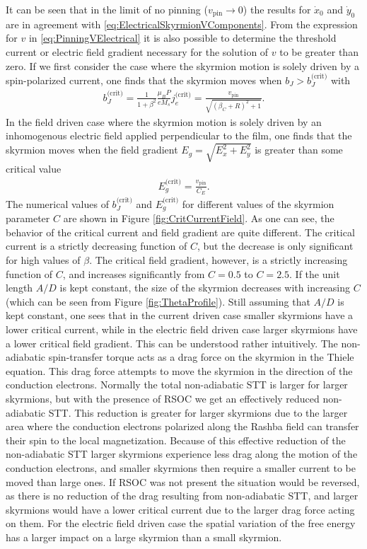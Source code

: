 It can be seen that in the limit of no pinning ($v_{\textrm{pin}} \rightarrow 0$) the results for $\dot{x}_0$ and $\dot{y}_0$ are in agreement with \eqref{eq:ElectricalSkyrmionVComponents}. From the expression for $v$ in \eqref{eq:PinningVElectrical} it is also possible to determine the threshold current or electric field gradient necessary for the solution of $v$ to be greater than zero. If we first consider the case where the skyrmion motion is solely driven by a spin-polarized current, one finds that the skyrmion moves when $b_J > b_J^{\textrm{(crit)}}$ with
\begin{align}
b_J^{\textrm{(crit)}} = \frac{1}{1+\beta^2} \frac{\mu_BP}{eM_s}j_e^{\textrm{(crit)}}= \frac{v_{\textrm{pin}}}{\sqrt{(\beta_C+R)^2+1}}.
\end{align}
In the field driven case where the skyrmion motion is solely driven by an inhomogenous electric field applied perpendicular to the film, one finds that the skyrmion moves when the field gradient $E_g = \sqrt{E_x^2+E_y^2}$ is greater than some critical value
\begin{align}
E_g^{\textrm{(crit)}} = \frac{v_{\textrm{pin}}}{C_E}.
\end{align}
The numerical values of $b_J^{\text{(crit)}}$ and $E_g^{\text{(crit)}}$ for different values of the skyrmion parameter $C$ are shown in Figure \ref{fig:CritCurrentField}. As one can see, the behavior of the critical current and field gradient are quite different. The critical current is a strictly decreasing function of $C$, but the decrease is only significant for high values of $\beta$. The critical field gradient, however, is a strictly increasing function of $C$, and increases significantly from $C = 0.5$ to $C = 2.5$. If the unit length $A/D$ is kept constant, the size of the skyrmion decreases with increasing $C$ (which can be seen from Figure \ref{fig:ThetaProfile}). Still assuming that $A/D$ is kept constant, one sees that in the current driven case smaller skyrmions have a lower critical current, while in the electric field driven case larger skyrmions have a lower critical field gradient. This can be understood rather intuitively. The non-adiabatic spin-transfer torque acts as a drag force on the skyrmion in the Thiele equation. This drag force attempts to move the skyrmion in the direction of the conduction electrons. Normally the total non-adiabatic STT is larger for larger skyrmions, but with the presence of RSOC we get an effectively reduced non-adiabatic STT. This reduction is greater for larger skyrmions due to the larger area where the conduction electrons polarized along the Rashba field can transfer their spin to the local magnetization. Because of this effective reduction of the non-adiabatic STT larger skyrmions experience less drag along the motion of the conduction electrons, and smaller skyrmions then require a smaller current to be moved than large ones. If RSOC was not present the situation would be reversed, as there is no reduction of the drag resulting from non-adiabatic STT, and larger skyrmions would have a lower critical current due to the larger drag force acting on them. For the electric field driven case the spatial variation of the free energy has a larger impact on a large skyrmion than a small skyrmion.


